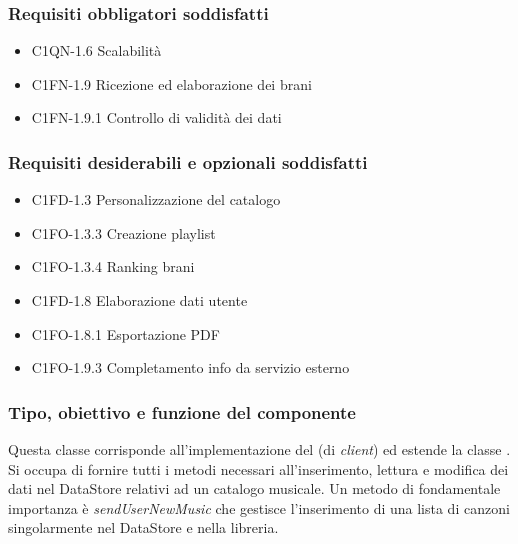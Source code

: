 \subsubsection*{Requisiti obbligatori soddisfatti}
\begin{itemize}
    \item C1QN-1.6 Scalabilit\`a
    \item C1FN-1.9 Ricezione ed elaborazione dei brani
    \item C1FN-1.9.1 Controllo di validit\`a dei dati
\end{itemize}
\subsubsection*{Requisiti desiderabili e opzionali soddisfatti}
\begin{itemize}
    \item C1FD-1.3 Personalizzazione del catalogo
    \item C1FO-1.3.3 Creazione playlist
    \item C1FO-1.3.4 Ranking brani
    \item C1FD-1.8 Elaborazione dati utente
    \item C1FO-1.8.1 Esportazione PDF
    \item C1FO-1.9.3 Completamento info da servizio esterno
\end{itemize}
\subsubsection*{Tipo, obiettivo e funzione del componente}
Questa classe corrisponde all'implementazione del  (di
\emph{client}) ed estende la classe . Si occupa di
fornire tutti i metodi necessari all'inserimento, lettura e modifica dei dati
nel DataStore relativi ad un catalogo musicale. Un
metodo di fondamentale importanza \`e
\emph{sendUserNewMusic} che gestisce l'inserimento di
una lista di canzoni singolarmente nel DataStore e nella
libreria.
